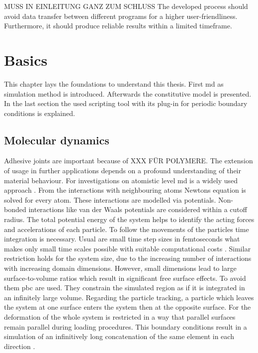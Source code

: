 

MUSS IN EINLEITUNG GANZ ZUM SCHLUSS
The developed process should avoid data transfer between different programs for a higher user-friendliness. Furthermore, it should produce reliable results within a limited timeframe. 


\chapter{Basics} \label{chap: basics}
This chapter lays the foundations to understand this thesis. First \acrfull{md} as simulation method is introduced. Afterwards the constitutive model is presented. In the last section the used scripting tool with its plug-in for periodic boundary conditions is explained.  

\section{Molecular dynamics} \label{sec: MDBasics}
Adhesive joints are important because of XXX FÜR POLYMERE. The extension of usage in further applications depends on a profound understanding of their material behaviour. For investigations on atomistic level \acrfull{md} is a widely used approach  \cite{ries_mechanical_2024}. From the interactions with neighbouring atoms Newtons equation is solved for every atom. These interactions are modelled via potentials. Non-bonded interactions like van der Waals potentials are considered within a cutoff radius. The total potential energy of the system helps to identify the acting forces and accelerations of each particle. To follow the movements of the particles time integration is necessary. Usual are small time step sizes in femtoseconds what makes only small time scales possible with suitable computational costs \cite{ries_mechanical_2024}. Similar restriction holds for the system size, due to the increasing number of interactions with increasing domain dimensions. However, small dimensions lead to large surface-to-volume ratios which result in significant free surface effects. To avoid them \acrfull{pbc} are used. They constrain the simulated region as if it is integrated in an infinitely large volume. Regarding the particle tracking, a particle which leaves the system at one surface enters the system then at the opposite surface. For the deformation of the whole system is restricted in a way that parallel surfaces remain parallel during loading procedures. This boundary conditions result in a simulation of an infinitively long concatenation of the same element in each direction \cite{gorbunov_periodic_2022}.
